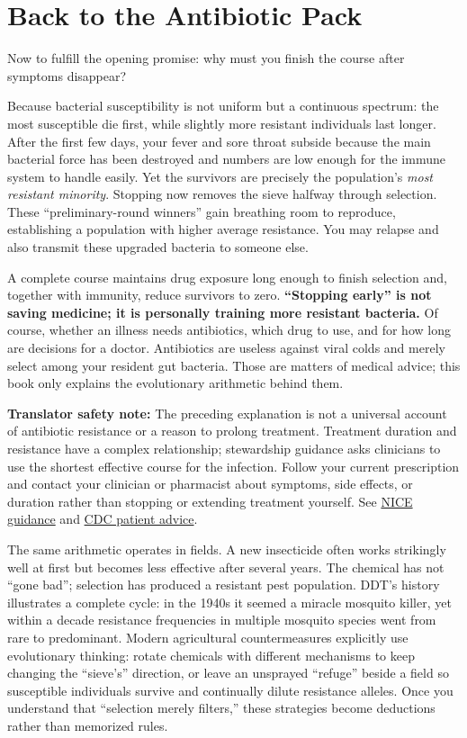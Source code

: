 \section{Back to the Antibiotic Pack}

Now to fulfill the opening promise: why must you finish the course after symptoms disappear?

Because bacterial susceptibility is not uniform but a continuous spectrum: the most susceptible die first, while slightly more resistant individuals last longer. After the first few days, your fever and sore throat subside because the main bacterial force has been destroyed and numbers are low enough for the immune system to handle easily. Yet the survivors are precisely the population's \emph{most resistant minority}. Stopping now removes the sieve halfway through selection. These ``preliminary-round winners'' gain breathing room to reproduce, establishing a population with higher average resistance. You may relapse and also transmit these upgraded bacteria to someone else.

A complete course maintains drug exposure long enough to finish selection and, together with immunity, reduce survivors to zero. \textbf{``Stopping early'' is not saving medicine; it is personally training more resistant bacteria.} Of course, whether an illness needs antibiotics, which drug to use, and for how long are decisions for a doctor. Antibiotics are useless against viral colds and merely select among your resident gut bacteria. Those are matters of medical advice; this book only explains the evolutionary arithmetic behind them.

\textbf{Translator safety note:} The preceding explanation is not a universal account of antibiotic resistance or a reason to prolong treatment. Treatment duration and resistance have a complex relationship; stewardship guidance asks clinicians to use the shortest effective course for the infection. Follow your current prescription and contact your clinician or pharmacist about symptoms, side effects, or duration rather than stopping or extending treatment yourself. See \href{https://www.nice.org.uk/guidance/ng15/evidence/full-guideline-pdf-252320799}{NICE guidance} and \href{https://www.cdc.gov/antibiotic-use/about/}{CDC patient advice}.

The same arithmetic operates in fields. A new insecticide often works strikingly well at first but becomes less effective after several years. The chemical has not ``gone bad''; selection has produced a resistant pest population. DDT's history illustrates a complete cycle: in the 1940s it seemed a miracle mosquito killer, yet within a decade resistance frequencies in multiple mosquito species went from rare to predominant. Modern agricultural countermeasures explicitly use evolutionary thinking: rotate chemicals with different mechanisms to keep changing the ``sieve's'' direction, or leave an unsprayed ``refuge'' beside a field so susceptible individuals survive and continually dilute resistance alleles. Once you understand that ``selection merely filters,'' these strategies become deductions rather than memorized rules.

